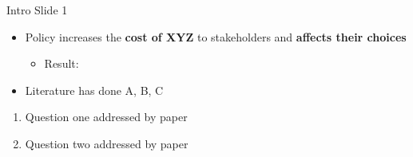 

\begin{frame}{Intro Slide 1}
\begin{itemize}
    \item Policy increases the \textbf{cost of XYZ} to stakeholders and \textbf{affects their choices}
    \begin{itemize}
    \item Result: 
\end{itemize}
\end{itemize}

\vfill
\pause

\begin{itemize}
 \item[\textcolor{red}{$\blacktriangleright$}] Literature has done A, B, C
\end{itemize}

\vspace{0.5cm} 

\vfill
\pause


\begin{enumerate}

\item Question one addressed by paper

\item Question two addressed by paper

\end{enumerate}
\end{frame}


